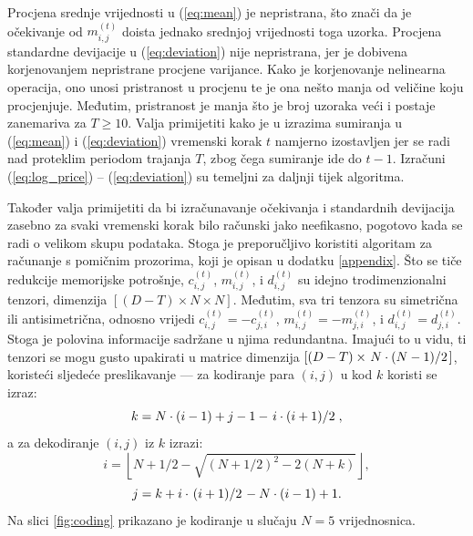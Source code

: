 \documentclass[lmodern, utf8, diplomski, numeric]{fer}
\newcommand{\q}{\left}
\newcommand{\w}{\right}
\begin{document}
  Procjena srednje vrijednosti u (\ref{eq:mean}) je nepristrana, što znači da je očekivanje od $m_{i,j}^{\q(t\w)}$ doista jednako srednjoj vrijednosti toga uzorka.
  Procjena standardne devijacije u (\ref{eq:deviation}) nije nepristrana, jer je dobivena korjenovanjem nepristrane procjene varijance.
  Kako je korjenovanje nelinearna operacija, ono unosi pristranost u procjenu te je ona nešto manja od veličine koju procjenjuje.
  Međutim, pristranost je manja što je broj uzoraka veći i postaje zanemariva za $T \ge 10$.
  Valja primijetiti kako je u izrazima sumiranja u (\ref{eq:mean}) i (\ref{eq:deviation}) vremenski korak $t$ namjerno izostavljen jer se radi nad proteklim periodom trajanja $T$, zbog čega sumiranje ide do $t - 1$.
  Izračuni (\ref{eq:log_price}) -- (\ref{eq:deviation}) su temeljni za daljnji tijek algoritma.

  Također valja primijetiti da bi izračunavanje očekivanja i standardnih devijacija zasebno za svaki vremenski korak bilo računski jako neefikasno, pogotovo kada se radi o velikom skupu podataka.
  Stoga je preporučljivo koristiti algoritam za računanje s pomičnim prozorima, koji je opisan u dodatku \ref{appendix}.
  Što se tiče redukcije memorijske potrošnje, $c_{i,j}^{\q(t\w)}$, $m_{i,j}^{\q(t\w)}$, i $d_{i,j}^{\q(t\w)}$ su idejno trodimenzionalni tenzori, dimenzija $\q[(D - T) \times N \times N\w]$.
  Međutim, sva tri tenzora su simetrična ili antisimetrična, odnosno vrijedi $c_{i,j}^{\q(t\w)} = -c_{j,i}^{\q(t\w)}$, $m_{i,j}^{\q(t\w)} = -m_{j,i}^{\q(t\w)}$, i $d_{i,j}^{\q(t\w)} = d_{j,i}^{\q(t\w)}$. Stoga je polovina informacije sadržane u njima redundantna.
  Imajući to u vidu, ti tenzori se mogu gusto upakirati u matrice dimenzija $\q[(D - T) \times \q. N\cdot(N - 1) \middle/ 2\w.\w]$, koristeći sljedeće preslikavanje --- za kodiranje para $(i,j)$ u kod $k$ koristi se izraz:
  \begin{equation} k = N \cdot (i - 1) + j - 1 - \q. i \cdot (i + 1) \middle/ 2\w., \end{equation}
  a za dekodiranje $(i, j)$ iz $k$ izrazi:
  \begin{equation} i = \q \lfloor N + 1/2 - \sqrt{(N + 1/2)^2 - 2(N + k)} \w \rfloor, \end{equation}
  \begin{equation} j = k + i \cdot \q.(i + 1) \middle/ 2\w. - N \cdot (i - 1) + 1. \end{equation}
  Na slici \ref{fig:coding} prikazano je kodiranje u slučaju $N = 5$ vrijednosnica.
  
\end{document}
